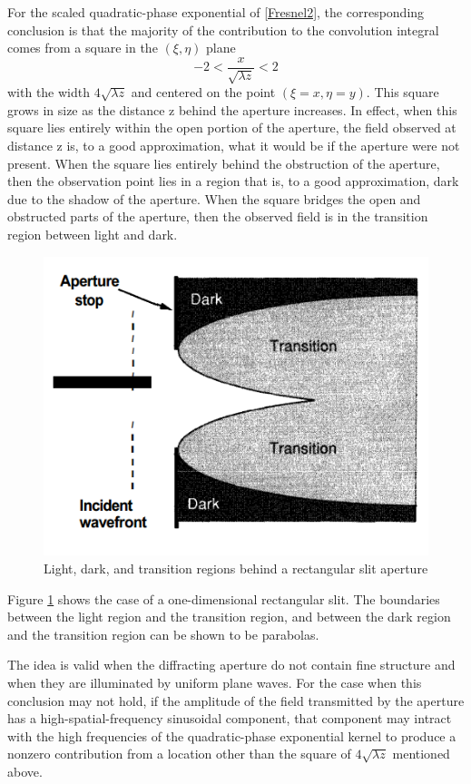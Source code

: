 \documentclass[../main.tex]{subfiles}
\begin{document}
	For the scaled quadratic-phase exponential of \ref{Fresnel2}, the corresponding conclusion is that the majority of the contribution to the convolution integral comes from a square in the $(\xi,\eta)$ plane
	\begin{equation}
	-2<\frac{x}{\sqrt{\lambda z}}<2
	\end{equation}
	with the width $4\sqrt{\lambda z}$ and centered on the point $(\xi=x,\eta=y)$. This square grows in size as the distance z behind the aperture increases. In effect, when this square lies entirely within the open portion of the aperture, the field observed at distance z is, to a good approximation, what it would be if the aperture were not present. When the square lies entirely behind the obstruction of the aperture, then the observation point lies in a region that is, to a good approximation, dark due to the shadow of the aperture. When the square bridges the open and obstructed parts of the aperture, then the observed field is in the transition region between light and dark.
	\begin{figure}[h!]
	  \centering
	  \includegraphics[scale=0.5]{../graphics/Wave_optics9.png}
	  \caption{Light, dark, and transition regions behind a rectangular slit aperture}
	  \label{fig:regions}
	\end{figure}
	Figure \ref{fig:regions} shows the case of a one-dimensional rectangular slit. The boundaries between the light region and the transition region, and between the dark region and the transition region can be shown to be parabolas.

	The idea is valid when the diffracting aperture do not contain fine structure and when they are illuminated by uniform plane waves. For the case when this conclusion may not hold, if the amplitude of the field transmitted by the aperture has a high-spatial-frequency sinusoidal component, that component may intract with the high frequencies of the quadratic-phase exponential kernel to produce a nonzero contribution from a location other than the square of $4\sqrt{\lambda z}$ mentioned above.
\end{document}
